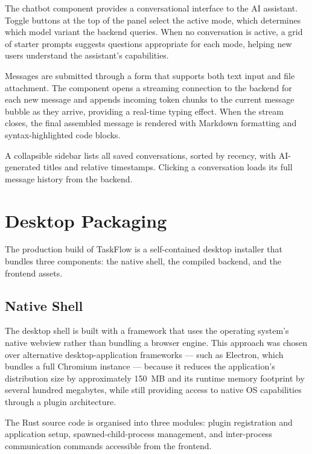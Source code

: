 The chatbot component provides a conversational interface to the AI assistant.
Toggle buttons at the top of the panel select the active mode, which
determines which model variant the backend queries. When no conversation is
active, a grid of starter prompts suggests questions appropriate for each mode,
helping new users understand the assistant's capabilities.

Messages are submitted through a form that supports both text input and file
attachment. The component opens a streaming connection to the backend for each
new message and appends incoming token chunks to the current message bubble as
they arrive, providing a real-time typing effect. When the stream closes, the
final assembled message is rendered with Markdown formatting and syntax-highlighted
code blocks.

A collapsible sidebar lists all saved conversations, sorted by recency, with
AI-generated titles and relative timestamps. Clicking a conversation loads its
full message history from the backend.

\section{Desktop Packaging}\label{sec:meth_desktop}

The production build of TaskFlow is a self-contained desktop installer that
bundles three components: the native shell, the compiled backend, and the
frontend assets.

\subsection{Native Shell}

The desktop shell is built with a framework that uses the operating system's
native webview rather than bundling a browser engine. This approach was chosen
over alternative desktop-application frameworks --- such as Electron, which
bundles a full Chromium instance --- because it reduces the application's
distribution size by approximately 150~MB and its runtime memory footprint by
several hundred megabytes, while still providing access to native OS
capabilities through a plugin architecture.

The Rust source code is organised into three modules: plugin registration and
application setup, spawned-child-process management, and inter-process
communication commands accessible from the frontend.

